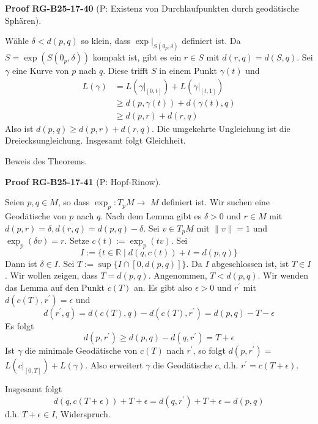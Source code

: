 \documentclass[10pt, letterpaper]{article}
\newcommand{\CustomHeading}[3]{%
  \par\medskip\noindent%
  \textbf{#1 #2} \textnormal{(#3)}.\enskip%
}
\newenvironment{PROOF}[2]{\begin{unitbox}\CustomHeading{Proof}{#1}{#2}}{\end{unitbox}}
\begin{document}
\begin{PROOF}{RG-B25-17-40}{P: Existenz von Durchlaufpunkten durch geodätische Sphären}
Wähle $\delta<d(p, q)$ so klein, dass $\left.\exp \right|_{S\left(0_{p}, \delta\right)}$ definiert ist. Da $S=\exp \left(S\left(0_{p}, \delta\right)\right)$ kompakt ist, gibt es ein $r \in S$ mit $d(r, q)=d(S, q)$. Sei $\gamma$ eine Kurve von $p$ nach $q$. Diese trifft $S$ in einem Punkt $\gamma(t)$ und
$$
\begin{aligned}
L(\gamma) & =L\left(\left.\gamma\right|_{[0, t]}\right)+L\left(\left.\gamma\right|_{[t, 1]}\right) \\
& \geq d(p, \gamma(t))+d(\gamma(t), q) \\
& \geq d(p, r)+d(r, q)
\end{aligned}
$$
Also ist $d(p, q) \geq d(p, r)+d(r, q)$. Die umgekehrte Ungleichung ist die Dreiecksungleichung. Insgesamt folgt Gleichheit.
\end{PROOF}



Beweis des Theorems. 

\begin{PROOF}{RG-B25-17-41}{P: Hopf-Rinow}
Seien $p, q \in M$, so dass $\exp _{p}: T_{p} M \rightarrow$ $M$ definiert ist. Wir suchen eine Geodätische von $p$ nach $q$. Nach dem Lemma gibt es $\delta>0$ und $r \in M$ mit $d(p, r)=\delta, d(r, q)=d(p, q)-\delta$.
Sei $v \in T_{p} M$ mit $\|v\|=1$ und $\exp _{p}(\delta v)=r$. Setze $c(t):=\exp _{p}(t v)$. Sei
$$
I:=\{t \in \mathbb{R} \mid d(q, c(t))+t=d(p, q)\}
$$
Dann ist $\delta \in I$. Sei $T:=\sup \{I \cap[0, d(p, q)]\}$. Da $I$ abgeschlossen ist, ist $T \in I$. Wir wollen zeigen, dass $T=d(p, q)$. Angenommen, $T<d(p, q)$. Wir wenden das Lemma auf den Punkt $c(T)$ an. Es gibt also $\epsilon>0$ und $r^{\prime}$ mit $d\left(c(T), r^{\prime}\right)=\epsilon$ und
$$
d\left(r^{\prime}, q\right)=d(c(T), q)-d\left(c(T), r^{\prime}\right)=d(p, q)-T-\epsilon
$$
Es folgt
$$
d\left(p, r^{\prime}\right) \geq d(p, q)-d\left(q, r^{\prime}\right)=T+\epsilon
$$
Ist $\gamma$ die minimale Geodätische von $c(T)$ nach $r^{\prime}$, so folgt $d\left(p, r^{\prime}\right)=$ $L\left(\left.c\right|_{[0, T]}\right)+L(\gamma)$. Also erweitert $\gamma$ die Geodätische $c$, d.h. $r^{\prime}=c(T+\epsilon)$.

Insgesamt folgt
$$
d(q, c(T+\epsilon))+T+\epsilon=d\left(q, r^{\prime}\right)+T+\epsilon=d(p, q)
$$
d.h. $T+\epsilon \in I$, Widerspruch.
\end{PROOF}
\end{document}
